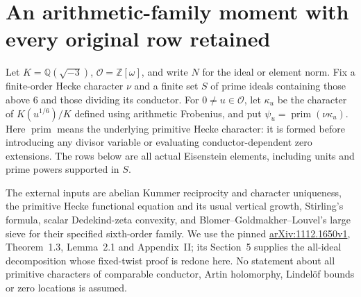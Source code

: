 \documentclass[11pt]{article}
\begin{document}
\section{An arithmetic-family moment with every original row retained}
\label{mm:core}
Let $K=\mathbb Q(\sqrt{-3})$, $\mathcal O=\mathbb Z[\omega]$, and write
$N$ for the ideal or element norm. Fix a finite-order Hecke character
$\nu$ and a finite set $S$ of prime ideals containing those above $6$ and
those dividing its conductor. For $0\ne u\in\mathcal O$, let $\kappa_u$
be the character of $K(u^{1/6})/K$ defined using arithmetic Frobenius, and
put $\psi_u=\operatorname{prim}(\nu\kappa_u)$. Here
$\operatorname{prim}$ means the underlying primitive Hecke character:
it is formed before introducing any divisor variable or evaluating
conductor-dependent zero extensions. The rows below are all actual
Eisenstein elements, including units and prime powers supported in $S$.

The external inputs are abelian Kummer reciprocity and character
uniqueness, the primitive Hecke functional equation and its usual
vertical growth, Stirling's formula, scalar Dedekind-zeta convexity, and
Blomer--Goldmakher--Louvel's large sieve for their specified sixth-order
family. We use the pinned
\href{https://arxiv.org/pdf/1112.1650v1}{arXiv:1112.1650v1},
Theorem~1.3, Lemma~2.1 and Appendix~II; its Section~5 supplies the
all-ideal decomposition whose fixed-twist proof is redone here.
No statement about all primitive characters of comparable conductor,
Artin holomorphy, Lindel\"of bounds or zero locations is assumed.
\end{document}

